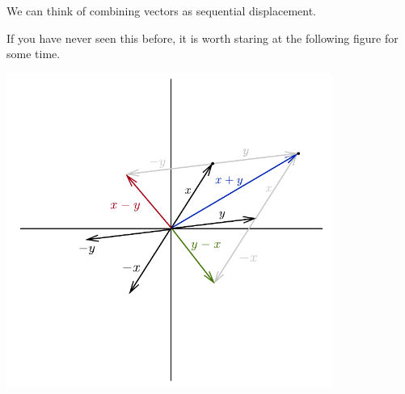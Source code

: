 
We can think of combining vectors as sequential displacement.

If you have never seen this before, it is worth staring at the following figure for some time.
\begin{center}
\includegraphics[width=0.8\textwidth]{graphics/x-y}
\end{center}

\blankpage
